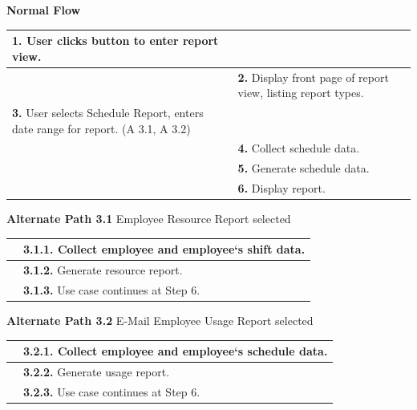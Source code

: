 \documentclass[letterpaper,12pt]{report}
\begin{document}
{ \centering \textbf{Normal Flow}
\begin{center}
\xuchead
\begin{tabular}{| p{8.5cm} | p{8.5cm} |}
\hline
\textbf{1.} User clicks button to enter report view. & \\
\hline
& \textbf{2.} Display front page of report view, listing report types. \\
\hline
\textbf{3.} User selects Schedule Report, enters date range for report. (A 3.1, A 3.2) & \\
\hline
& \textbf{4.} Collect schedule data. \\
\hline
& \textbf{5.} Generate schedule data. \\
\hline
& \textbf{6.} Display report. \\
\hline
\end{tabular}
\end{center}
\pagebreak
\centering \textbf{Alternate Path 3.1}
\linebreak Employee Resource Report selected
\begin{center}
\xuchead
\begin{tabular}{| p{8.5cm} | p{8.5cm} |}
\hline
& \textbf{3.1.1.} Collect employee and employee`s shift data. \\
\hline
& \textbf{3.1.2.} Generate resource report. \\
\hline
& \textbf{3.1.3.} Use case\index{Use Case} continues at Step 6. \\
\hline
\end{tabular}
\end{center}

\centering \textbf{Alternate Path 3.2}
\linebreak E-Mail Employee Usage Report selected
\begin{center}
\xuchead
\begin{tabular}{| p{8.5cm} | p{8.5cm} |}
\hline
& \textbf{3.2.1.} Collect employee and employee`s schedule data. \\
\hline
& \textbf{3.2.2.} Generate usage report. \\
\hline
& \textbf{3.2.3.} Use case\index{Use Case} continues at Step 6. \\
\hline
\end{tabular}
\end{center}

}
\end{document}
